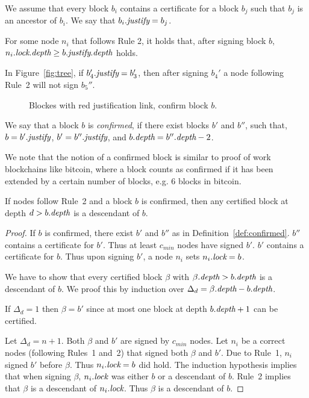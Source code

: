 \begin{definition} We assume that every block $b_i$ contains a certificate for a block $b_j$ such that $b_j$ is an ancestor of $b_i$. We say that $b_i.\textit{justify}=b_j$. 	
\end{definition}

\begin{lem}
	For some node $n_i$ that follows Rule 2, it holds that, after signing block $b$, $n_i.\textit{lock}.\textit{depth}\geq b.\textit{justify}.\textit{depth}$ holds.
\end{lem}

\begin{example} In Figure~\ref{fig:tree}, if $b_4'.\textit{justify}=b_3'$, then after signing $b_4'$ a node following Rule~2 will not sign $b_5''$.	
\end{example}

\begin{figure}
	\centering
	
	\caption{Blockes with red justification link, confirm block $b$.}
\end{figure}

\begin{definition}
\label{def:confirmed}	
We say that a block $b$ is \emph{confirmed}, if there exist blocks $b'$ and $b''$, such that, $b=b'.\textit{justify}$, $b'=b''.\textit{justify}$, and $b.\textit{depth} = b''.\textit{depth}-2$.	
\end{definition}

We note that the notion of a confirmed block is similar to proof of work blockchains like bitcoin, where a block counts as confirmed if it has been extended by a certain number of blocks, e.g. 6 blocks in bitcoin.

\begin{theorem}\label{thm:confirmed}
If nodes follow Rule~2 and a block $b$ is confirmed, then any certified block at depth $d>b.\textit{depth}$ is a descendant of $b$.
\end{theorem}

\begin{proof}
If $b$ is confirmed, there exist $b'$ and $b''$ as in Definition~\ref{def:confirmed}. $b''$ contains a certificate for $b'$. Thus at least $c_{min}$ nodes have signed $b'$. $b'$ contains a certificate for $b$. Thus upon signing $b'$, a node $n_i$ sets $n_i.\textit{lock}=b$.

We have to show that every certified block $\beta$ with $\beta.\textit{depth} > b.\textit{depth}$ is a descendant of $b$. We proof this by induction over $\Delta_d=\beta.\textit{depth}-b.\textit{depth}$. 

If $\Delta_d=1$ then $\beta=b'$ since at most one block at depth $b.\textit{depth}+1$ can be certified. 

Let $\Delta_d=n+1$. Both $\beta$ and $b'$ are signed by $c_{min}$ nodes. 
Let $n_i$ be a correct nodes (following Rules~1 and~2) that signed both $\beta$ and $b'$. Due to Rule~1,  $n_i$ signed $b'$ before $\beta$. 
Thus $n_i.\textit{lock}=b$ did hold. The induction hypothesis implies that when signing $\beta$, $n_i.\textit{lock}$ was either $b$ or a descendant of $b$. Rule~2 implies that $\beta$ is a descendant of $n_i.\textit{lock}$. Thus $\beta$ is a descendant of $b$.
\end{proof}